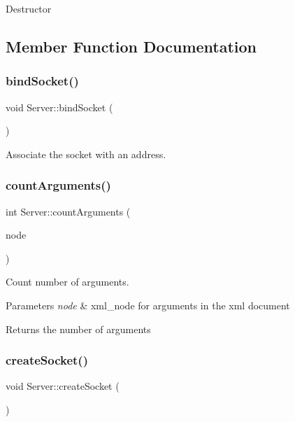 Destructor 

\subsection{Member Function Documentation}
\mbox{\label{classServer_a8d86edf1df9f12df07dc6e949d70f77f}} 
\subsubsection{\texorpdfstring{bind\+Socket()}{bindSocket()}}
{\footnotesize\ttfamily void Server\+::bind\+Socket (\begin{DoxyParamCaption}{ }\end{DoxyParamCaption})\hspace{0.3cm}{\ttfamily [private]}}

Associate the socket with an address. \mbox{\label{classServer_ad5472ee30f2eb795c29432d3cc7dac15}} 
\subsubsection{\texorpdfstring{count\+Arguments()}{countArguments()}}
{\footnotesize\ttfamily int Server\+::count\+Arguments (\begin{DoxyParamCaption}\item[{xml\+\_\+node}]{node }\end{DoxyParamCaption})\hspace{0.3cm}{\ttfamily [private]}}

Count number of arguments. 
\begin{DoxyParams}{Parameters}
{\em node} & xml\+\_\+node for arguments in the xml document \\
\hline
\end{DoxyParams}
\begin{DoxyReturn}{Returns}
the number of arguments 
\end{DoxyReturn}
\mbox{\label{classServer_afa110e18047a3345bca72ed32ca3ce95}} 
\subsubsection{\texorpdfstring{create\+Socket()}{createSocket()}}
{\footnotesize\ttfamily void Server\+::create\+Socket (\begin{DoxyParamCaption}{ }\end{DoxyParamCaption})\hspace{0.3cm}{\ttfamily [private]}}

